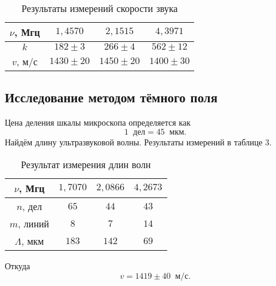 \documentclass[a4paper]{article}
\begin{document}
\begin{table}[!ht]
    \centering
    \caption{Результаты измерений скорости звука}
    \begin{tabular}{|c|c|c|c|}
    \hline
    $\nu$, Мгц & $1,4570$      & $2,1515$      & $4,3971$      \\ \hline
    $k$        & $182 \pm 3$   & $266 \pm 4$   & $562 \pm 12$  \\ \hline
    $v$, м/с   & $1430 \pm 20$ & $1450 \pm 20$ & $1400 \pm 30$ \\ \hline
    \end{tabular}
    \end{table}


\subsection{Исследование методом тёмного поля}

Цена деления шкалы микроскопа определяется как $$1 \;\;\text{дел} = 45 \;\;\text{мкм}.$$ Найдём длину ультразвуковой волны. Результаты измерений в таблице 3.

\begin{table}[!ht]
    \centering
    \caption{Результат измерения длин волн}
    \begin{tabular}{|c|c|c|c|}
    \hline
    $\nu$, Мгц     & $1,7070$ & $2,0866$ & $4,2673$ \\ \hline
    $n$, дел       & $65$     & $44$     & $43$     \\ \hline
    $m$, линий     & $8$      & $7$      & $14$     \\ \hline
    $\Lambda$, мкм & $183$    & $142$    & $69$     \\ \hline
    \end{tabular}
\end{table}

\noindent Откуда $$v = 1419 \pm 40 \;\; \text{м/с}.$$
\end{document}
